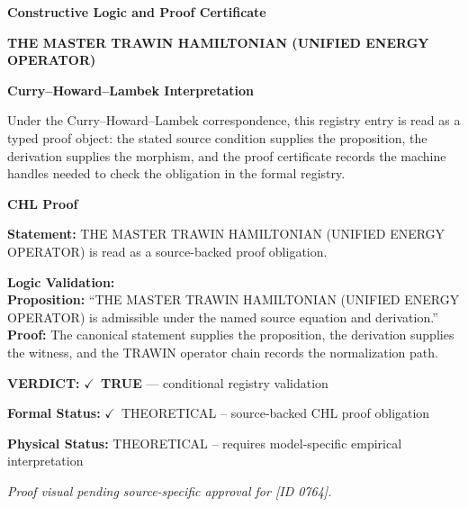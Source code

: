 \clearpage
\begingroup\tzpsupportsetup
\noindent\textbf{\fontsize{10.8pt}{12.8pt}\selectfont [ID 0764] Constructive Logic and Proof Certificate}\par
\noindent\textbf{\fontsize{10pt}{12pt}\selectfont THE MASTER TRAWIN HAMILTONIAN (UNIFIED ENERGY OPERATOR)}\par
\vspace{0.45em}
\begingroup
\footnotesize
\setlength{\parskip}{0.22em}
\setlength{\parindent}{0pt}
\noindent\textbf{Curry--Howard--Lambek Interpretation}\par
Under the Curry--Howard--Lambek correspondence, this registry entry is read as a typed proof
object: the stated source condition supplies the proposition, the derivation supplies the
morphism, and the proof certificate records the machine handles needed to check the obligation
in the formal registry.

\vspace{0.45em}
\noindent\textbf{CHL Proof}\par
\textbf{Statement:} THE MASTER TRAWIN HAMILTONIAN (UNIFIED ENERGY OPERATOR) is read as a source-backed proof obligation.

\textbf{Logic Validation:}\\
\textbf{Proposition:} ``THE MASTER TRAWIN HAMILTONIAN (UNIFIED ENERGY OPERATOR) is admissible under the named source equation and derivation.''\\
\textbf{Proof:} The canonical statement supplies the proposition, the derivation supplies the witness, and the TRAWIN operator chain records the normalization path.

\textbf{VERDICT:} \ensuremath{\checkmark}\ \textbf{TRUE} --- conditional registry validation

\textbf{Formal Status:} \ensuremath{\checkmark}\ THEORETICAL -- source-backed CHL proof obligation

\textbf{Physical Status:} THEORETICAL -- requires model-specific empirical interpretation
\par\vspace{0.45em}
\par
\vfill
\begingroup\footnotesize\itshape
Proof visual pending source-specific approval for [ID 0764].
\par\endgroup
\vfill
\endgroup
\endgroup
